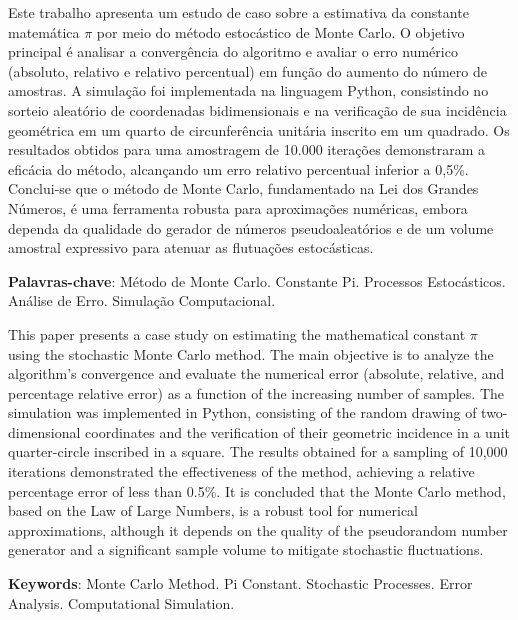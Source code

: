 \imprimircapa

\imprimirfolhaderosto

\setlength{\absparsep}{18pt} %
\begin{resumo}
	\SingleSpacing
	Este trabalho apresenta um estudo de caso sobre a estimativa da constante matemática \texorpdfstring{$\pi$}{pi} por meio do método estocástico de Monte Carlo. O objetivo principal é analisar a convergência do algoritmo e avaliar o erro numérico (absoluto, relativo e relativo percentual) em função do aumento do número de amostras. A simulação foi implementada na linguagem Python, consistindo no sorteio aleatório de coordenadas bidimensionais e na verificação de sua incidência geométrica em um quarto de circunferência unitária inscrito em um quadrado. Os resultados obtidos para uma amostragem de 10.000 iterações demonstraram a eficácia do método, alcançando um erro relativo percentual inferior a 0,5\%. Conclui-se que o método de Monte Carlo, fundamentado na Lei dos Grandes Números, é uma ferramenta robusta para aproximações numéricas, embora dependa da qualidade do gerador de números pseudoaleatórios e de um volume amostral expressivo para atenuar as flutuações estocásticas.
	
	\vspace{\onelineskip}
	\noindent
	\textbf{Palavras-chave}: Método de Monte Carlo. Constante Pi. Processos Estocásticos. Análise de Erro. Simulação Computacional.
\end{resumo}

\begin{resumo}[Abstract]
	\SingleSpacing
	This paper presents a case study on estimating the mathematical constant \texorpdfstring{$\pi$}{pi} using the stochastic Monte Carlo method. The main objective is to analyze the algorithm's convergence and evaluate the numerical error (absolute, relative, and percentage relative error) as a function of the increasing number of samples. The simulation was implemented in Python, consisting of the random drawing of two-dimensional coordinates and the verification of their geometric incidence in a unit quarter-circle inscribed in a square. The results obtained for a sampling of 10,000 iterations demonstrated the effectiveness of the method, achieving a relative percentage error of less than 0.5\%. It is concluded that the Monte Carlo method, based on the Law of Large Numbers, is a robust tool for numerical approximations, although it depends on the quality of the pseudorandom number generator and a significant sample volume to mitigate stochastic fluctuations.
		
	\vspace{\onelineskip}
	\noindent
	\textbf{Keywords}: Monte Carlo Method. Pi Constant. Stochastic Processes. Error Analysis. Computational Simulation.
\end{resumo}

